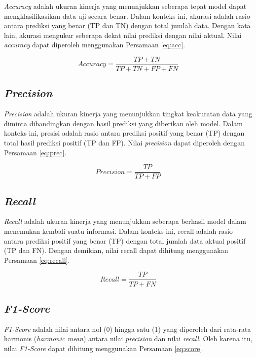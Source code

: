 \emph{Accuracy} adalah ukuran kinerja yang menunjukkan seberapa tepat model dapat mengklasifikasikan data uji secara benar. Dalam konteks ini, akurasi adalah rasio antara prediksi yang benar (TP dan TN) dengan total jumlah data. Dengan kata lain, akurasi mengukur seberapa dekat nilai prediksi dengan nilai aktual. Nilai \emph{accuracy} dapat diperoleh menggunakan Persamaan \ref{eq:acc}. 

\begin{equation}
  \label{eq:acc}
  Accuracy=\frac{TP+TN}{TP+TN+FP+FN}
\end{equation}

\subsection{\emph{Precision}}
\label{subsec:prec_klasifikasi}

\emph{Precision} adalah ukuran kinerja yang menunjukkan tingkat keakuratan data yang diminta dibandingkan dengan hasil prediksi yang diberikan oleh model. Dalam konteks ini, presisi adalah rasio antara prediksi positif yang benar (TP) dengan total hasil prediksi positif (TP dan FP). Nilai \emph{precision} dapat diperoleh dengan Persamaan \ref{eq:prec}.

\begin{equation}
  \label{eq:prec}
  Precision=\frac{TP}{TP+FP}
\end{equation}

\subsection{\emph{Recall}}
\label{subsec:recall_klasifikasi}

\emph{Recall} adalah ukuran kinerja yang menunjukkan seberapa berhasil model dalam menemukan kembali suatu informasi. Dalam konteks ini, recall adalah rasio antara prediksi positif yang benar (TP) dengan total jumlah data aktual positif (TP dan FN). Dengan demikian, nilai recall dapat dihitung menggunakan Persamaan \ref{eq:recall}.

\begin{equation}
  \label{eq:recall}
  Recall=\frac{TP}{TP+FN}
\end{equation}

\subsection{\emph{F1-Score}}
\label{subsec:score_klasifikasi}

\emph{F1-Score} adalah nilai antara nol (0) hingga satu (1) yang diperoleh dari rata-rata harmonis (\emph{harmonic mean}) antara nilai \emph{precision} dan nilai \emph{recall}. Oleh karena itu, nilai \emph{F1-Score} dapat dihitung menggunakan Persamaan \ref{eq:score}.

